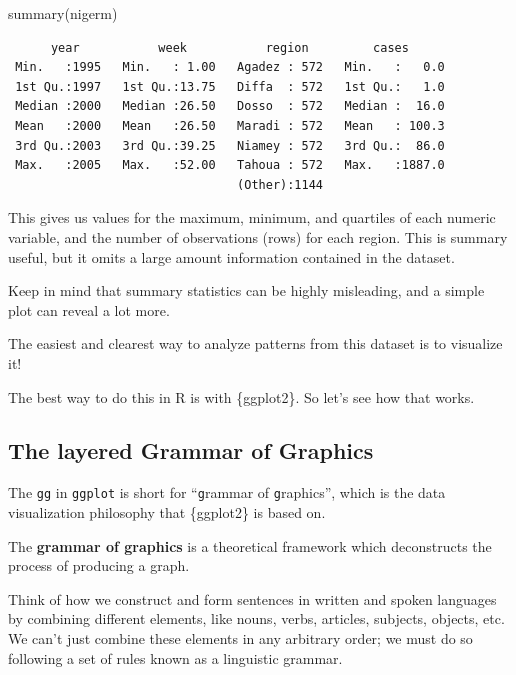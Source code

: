 \documentclass[
  letterpaper,
  DIV=11,
  numbers=noendperiod]{scrreprt}
\newenvironment{Shaded}{\begin{snugshade}}{\end{snugshade}}
\newcommand{\FunctionTok}[1]{\textcolor[rgb]{0.28,0.35,0.67}{#1}}
\newcommand{\NormalTok}[1]{\textcolor[rgb]{0.00,0.23,0.31}{#1}}
\begin{document}
\begin{Shaded}
\begin{Highlighting}[]
\FunctionTok{summary}\NormalTok{(nigerm)}
\end{Highlighting}
\end{Shaded}

\begin{verbatim}
      year           week           region         cases       
 Min.   :1995   Min.   : 1.00   Agadez : 572   Min.   :   0.0  
 1st Qu.:1997   1st Qu.:13.75   Diffa  : 572   1st Qu.:   1.0  
 Median :2000   Median :26.50   Dosso  : 572   Median :  16.0  
 Mean   :2000   Mean   :26.50   Maradi : 572   Mean   : 100.3  
 3rd Qu.:2003   3rd Qu.:39.25   Niamey : 572   3rd Qu.:  86.0  
 Max.   :2005   Max.   :52.00   Tahoua : 572   Max.   :1887.0  
                                (Other):1144                   
\end{verbatim}

This gives us values for the maximum, minimum, and quartiles of each
numeric variable, and the number of observations (rows) for each region.
This is summary useful, but it omits a large amount information
contained in the dataset.

Keep in mind that summary statistics can be highly misleading, and a
simple plot can reveal a lot more.

The easiest and clearest way to analyze patterns from this dataset is to
visualize it!

The best way to do this in R is with \{ggplot2\}. So let's see how that
works.

\hypertarget{the-layered-grammar-of-graphics}{%
\subsection{The layered Grammar of
Graphics}\label{the-layered-grammar-of-graphics}}

The \texttt{gg} in \texttt{ggplot} is short for ``\texttt{g}rammar of
\texttt{g}raphics'', which is the data visualization philosophy that
\{ggplot2\} is based on.

The \textbf{grammar of graphics} is a theoretical framework which
deconstructs the process of producing a graph.

Think of how we construct and form sentences in written and spoken
languages by combining different elements, like nouns, verbs, articles,
subjects, objects, etc. We can't just combine these elements in any
arbitrary order; we must do so following a set of rules known as a
linguistic grammar.
\end{document}
